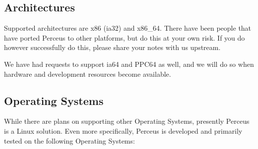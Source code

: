 \documentclass[10pt,letterpaper]{report}
\begin{document}
\subsection{Architectures}

Supported architectures are x86 (ia32) and x86\_64. There have been people that
have ported Perceus to other platforms, but do this at your own risk. If you do
however successfully do this, please share your notes with us upstream.

We have had requests to support ia64 and PPC64 as well, and we will do so when
hardware and development resources become available.

\subsection{Operating Systems}

While there are plans on supporting other Operating Systems, presently Perceus
is a Linux solution.  Even more specifically, Perceus is developed and
primarily tested on the following Operating Systems:
\end{document}
